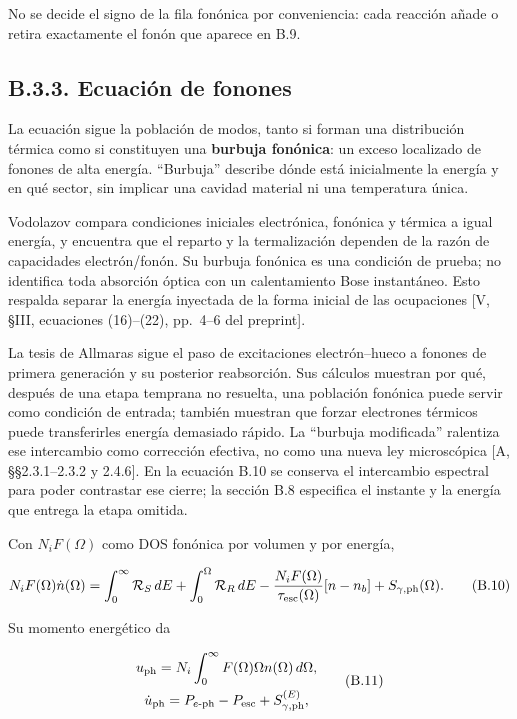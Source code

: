 \documentclass[
  spanish,
  10pt,
  a4paper,
]{article}
\newcounter{none} %
\begin{document}
No se decide el signo de la fila fonónica por conveniencia: cada
reacción añade o retira exactamente el fonón que aparece en B.9.

\subsection{B.3.3. Ecuación de
fonones}\label{b.3.3.-ecuaciuxf3n-de-fonones}

La ecuación sigue la población de modos, tanto si forman una
distribución térmica como si constituyen una \textbf{burbuja fonónica}:
un exceso localizado de fonones de alta energía. ``Burbuja'' describe
dónde está inicialmente la energía y en qué sector, sin implicar una
cavidad material ni una temperatura única.

Vodolazov compara condiciones iniciales electrónica, fonónica y térmica
a igual energía, y encuentra que el reparto y la termalización dependen
de la razón de capacidades electrón/fonón. Su burbuja fonónica es una
condición de prueba; no identifica toda absorción óptica con un
calentamiento Bose instantáneo. Esto respalda separar la energía
inyectada de la forma inicial de las ocupaciones {[}V, §III, ecuaciones
(16)--(22), pp.~4--6 del preprint{]}.

La tesis de Allmaras sigue el paso de excitaciones electrón--hueco a
fonones de primera generación y su posterior reabsorción. Sus cálculos
muestran por qué, después de una etapa temprana no resuelta, una
población fonónica puede servir como condición de entrada; también
muestran que forzar electrones térmicos puede transferirles energía
demasiado rápido. La ``burbuja modificada'' ralentiza ese intercambio
como corrección efectiva, no como una nueva ley microscópica {[}A,
§§2.3.1--2.3.2 y 2.4.6{]}. En la ecuación B.10 se conserva el
intercambio espectral para poder contrastar ese cierre; la sección B.8
especifica el instante y la energía que entrega la etapa omitida.

Con \(N_iF(\Omega)\) como DOS fonónica por volumen y por energía,

\[
N_iF(\Omega)\dot n(\Omega)=
\int_0^\infty\mathcal R_S\,dE+
\int_0^\Omega\mathcal R_R\,dE
-\frac{N_iF(\Omega)}{\tau_{\rm esc}(\Omega)}[n-n_b]
+S_{\gamma,\rm ph}(\Omega). \tag{B.10}
\]

Su momento energético da

\[
\begin{gathered}
u_{\rm ph}=N_i\int_0^\infty F(\Omega)\Omega n(\Omega)\,d\Omega,\\
\dot u_{\rm ph}=P_{e\text{-ph}}-P_{\rm esc}+S_{\gamma,\rm ph}^{(E)},
\end{gathered} \tag{B.11}
\]
\end{document}

